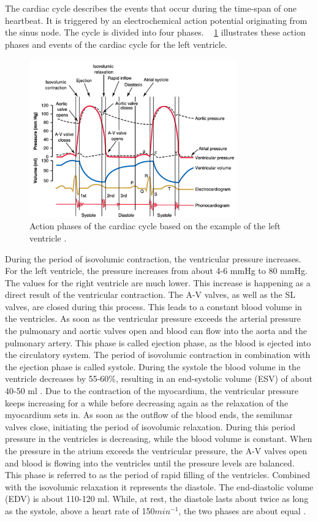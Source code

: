 The cardiac cycle describes the events that occur during the time-span of one heartbeat. It is triggered by an electrochemical action potential originating from the sinus node. The cycle is divided into four phases. \figurename~ \ref{fig:cardiac_cycle} illustrates these action phases and events of the cardiac cycle for the left ventricle.
\begin{figure}[h]
  \centering
  \includegraphics[width=0.8\textwidth]{images/cardiac_cycle.jpg}
  \caption{Action phases of the cardiac cycle based on the example of the left ventricle \cite{GH20}.}
  \label{fig:cardiac_cycle}
\end{figure}
During the period of isovolumic contraction, the ventricular pressure increases. For the left ventricle, the pressure increases from about 4-6 mmHg to 80 mmHg. The values for the right ventricle are much lower. This increase is happening as a direct result of the ventricular contraction. The A-V valves, as well as the SL valves, are closed during this process. This leads to a constant blood volume in the ventricles. As soon as the ventricular pressure exceeds the arterial pressure the pulmonary and aortic valves open and blood can flow into the aorta and the pulmonary artery. This phase is called ejection phase, as the blood is ejected into the circulatory system. The period of isovolumic contraction in combination with the ejection phase is called systole.\cite{HKS4} During the systole the blood volume in the ventricle decreases by 55-60\%, resulting in an end-systolic volume (ESV) of about 40-50 ml \cite{GH20}. Due to the contraction of the myocardium, the ventricular pressure keeps increasing for a while before decreasing again as the relaxation of the myocardium sets in. As soon as the outflow of the blood ends, the semilunar valves close, initiating the period of isovolumic relaxation. During this period pressure in the ventricles is decreasing, while the blood volume is constant. When the pressure in the atrium exceeds the ventricular pressure, the A-V valves open and blood is flowing into the ventricles until the pressure levels are balanced.\cite{HKS4} This phase is referred to as the period of rapid filling of the ventricles. Combined with the isovolumic relaxation it represents the diastole. The end-diastolic volume (EDV) is about 110-120 ml.\cite{GH20} While, at rest, the diastole lasts about twice as long as the systole, above a heart rate of 150$min^{-1}$, the two phases are about equal \cite{HKS4}.

